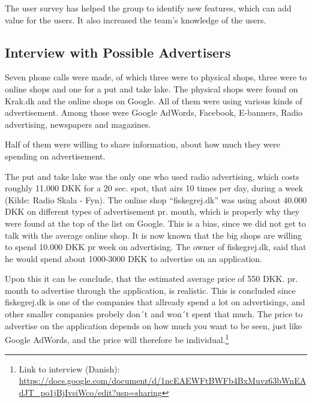 The user survey has helped the group to identify new features, which can add value for the users. It also increased the team's knowledge of the users.


\subsection{Interview with Possible Advertisers}
Seven phone calls were made, of which three were to physical shops, three were to online shops and one for a put and take lake. The physical shops were found on Krak.dk and the online shops on Google.
All of them were using various kinds of advertisement. Among those were Google AdWords, Facebook, E-banners, Radio advertising, newspapers and magazines.


Half of them were willing to share information, about how much they were spending on advertisement.

The put and take lake was the only one who used radio advertising, which costs roughly 11.000 DKK for a 20 sec. spot, that airs 10 times per day, during a week (Kilde: Radio Skala - Fyn). The online shop “fiskegrej.dk” was using about 40.000 DKK on different types of advertisement pr. month, which is properly why they were found at the top of the list on Google. This is a bias, since we did not get to talk with the average online shop.
It is now known that the big shops are willing to spend 10.000 DKK pr week on advertising. The owner of fiskegrej.dk, said that he would spend about 1000-3000 DKK to advertise on an application.

Upon this it can be conclude, that the estimated average price of 550 DKK. pr. month to advertise through the application, is realistic. This is concluded since fiskegrej.dk is one of the companies that allready spend a lot on advertisings, and other smaller companies probely don´t and won´t spent that much.
The price to advertise on the application depends on how much you want to be seen, just like Google AdWords, and the price will therefore be individual.\footnote{Link to interview (Danish): \url{https://docs.google.com/document/d/1ncEAEWFtBWFb4BxMuvz63bWnEAdJT_po1jBjIvsiWco/edit?usp=sharing}}  
